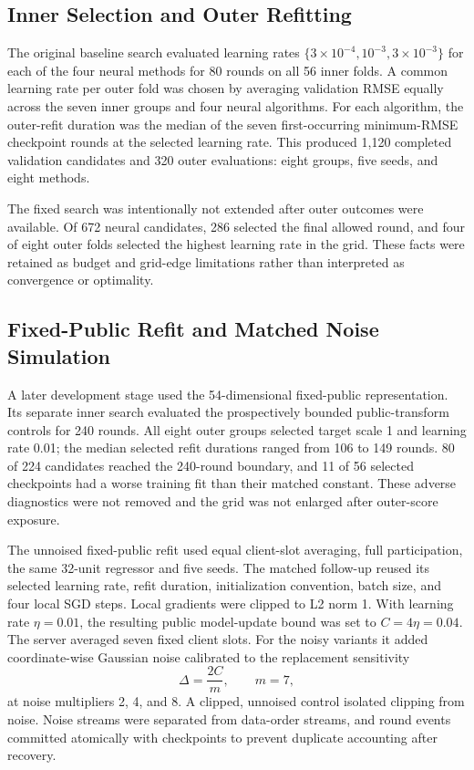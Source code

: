 \documentclass[journal]{IEEEtran}
\begin{document}
\subsection{Inner Selection and Outer Refitting}

The original baseline search evaluated learning rates
$\{3\times10^{-4}, 10^{-3}, 3\times10^{-3}\}$ for each of the four neural
methods for 80 rounds on all 56 inner folds. A common learning rate per outer
fold was chosen by averaging validation RMSE equally across the seven inner
groups and four neural algorithms. For each algorithm, the outer-refit duration
was the median of the seven first-occurring minimum-RMSE checkpoint rounds at
the selected learning rate. This produced 1,120 completed validation candidates
and 320 outer evaluations: eight groups, five seeds, and eight methods.

The fixed search was intentionally not extended after outer outcomes were
available. Of 672 neural candidates, 286 selected the final allowed round, and
four of eight outer folds selected the highest learning rate in the grid. These
facts were retained as budget and grid-edge limitations rather than interpreted
as convergence or optimality.

\subsection{Fixed-Public Refit and Matched Noise Simulation}

A later development stage used the 54-dimensional fixed-public representation.
Its separate inner search evaluated the prospectively bounded public-transform
controls for 240 rounds. All eight outer groups selected target scale 1 and
learning rate 0.01; the median selected refit durations ranged from 106 to 149
rounds. 80 of 224 candidates reached the 240-round boundary, and 11 of 56
selected checkpoints had a worse training fit than their matched constant. These
adverse diagnostics were not removed and the grid was not enlarged after
outer-score exposure.

The unnoised fixed-public refit used equal client-slot averaging, full
participation, the same 32-unit regressor and five seeds. The matched follow-up
reused its selected learning rate, refit duration, initialization convention,
batch size, and four local SGD steps. Local gradients were clipped to L2 norm 1.
With learning rate $\eta = 0.01$, the resulting public model-update bound was
set to $C = 4\eta = 0.04$. The server averaged seven fixed client slots. For the
noisy variants it added coordinate-wise Gaussian noise calibrated to the
replacement sensitivity
\[
  \Delta = \frac{2C}{m}, \qquad m = 7,
\]
at noise multipliers 2, 4, and 8. A clipped, unnoised control isolated clipping
from noise. Noise streams were separated from data-order streams, and round
events committed atomically with checkpoints to prevent duplicate accounting
after recovery.
\end{document}
